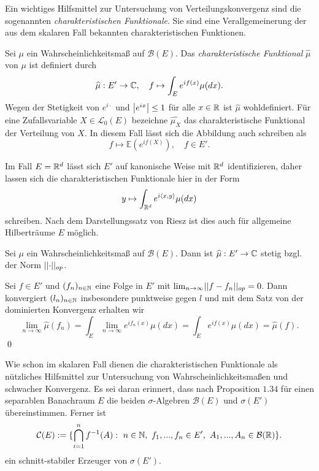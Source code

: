 Ein wichtiges Hilfsmittel zur Untersuchung von Verteilungskonvergenz sind die sogenannten \textit{charakteristischen Funktionale}. 
Sie sind eine Verallgemeinerung der aus dem skalaren Fall bekannten charakteristischen Funktionen.  

\begin{mydef}
    Sei $\mu$ ein Wahrscheinlichkeitsmaß auf $\mathcal{B}(E)$. 
    Das \textit{charakteristische Funktional} $\widehat{\mu}$ von $\mu$ ist definiert durch
    $$
        \widehat{\mu} : E' \to \mathbb{C}, \quad f \mapsto \int_{E}e^{if(x)}\mu(dx).
    $$
    Wegen der Stetigkeit von $e^{i\cdot}$ und $\left| e^{ix} \right|\leq 1$ für alle $x \in \mathbb{R}$ ist $\widehat{\mu}$ wohldefiniert. 
    Für eine Zufallsvariable $X \in \mathcal{L}_0(E)$ bezeichne $\widehat{\mu_X}$ das charakteristische Funktional der Verteilung von $X$. In diesem Fall lässt sich die Abbildung auch schreiben als
    $$
        f \mapsto \mathbb{E}(e^{if(X)}), \quad f \in E'. 
    $$
\end{mydef}

\begin{remark}
    Im Fall $E = \mathbb{R}^d$ lässt sich $E'$ auf kanonische Weise mit $\mathbb{R}^d$ identifizieren, daher lassen sich die charakteristischen Funktionale hier in der Form 
    $$
        y \mapsto \int_{\mathbb{R}^d}e^{i\langle x, y\rangle}\mu(dx)
    $$
    schreiben. Nach dem Darstellungssatz von Riesz ist dies auch für allgemeine Hilberträume $E$ möglich. 
\end{remark}

\begin{proposition}
    Sei $\mu$ ein Wahrscheinlichkeitsmaß auf $\mathcal{B}(E)$. Dann ist $\widehat{\mu}:E' \to \mathbb{C}$ stetig bzgl. der Norm $\lvert\lvert \cdot \rvert\rvert_{op}$. 
\end{proposition}
\begin{proof*}
    Sei $f \in E'$ und $(f_n)_{n \in \mathbb{N}}$ eine Folge in $E'$ mit $\lim_{n \to \infty}\lvert\lvert f-f_n \rvert\rvert_{op} = 0$. 
    Dann konvergiert $(l_n)_{n \in \mathbb{N}}$ insbesondere punktweise gegen $l$ und mit dem Satz von der dominierten Konvergenz erhalten wir 
    $$
        \lim_{n \to \infty} \widehat{\mu}(f_n) = \int_E\lim_{n \to \infty}e^{if_n(x)}\mu(dx) = \int_E e^{if(x)}\mu(dx) = \widehat{\mu}(f). 
    $$
    \qed
\end{proof*}

Wie schon im skalaren Fall dienen die charakteristischen Funktionale als nützliches Hilfsmittel zur Untersuchung von Wahrscheinlichkeitsmaßen und schwacher Konvergenz.
Es sei daran erinnert, dass nach Proposition $1.34$ für einen separablen Banachraum $E$ die beiden $\sigma$-Algebren $\mathcal{B}(E)$ und $\sigma(E')$ übereinstimmen. Ferner ist 
$$
    \mathcal{C}(E) := \{ \bigcap_{i=1}^n f^{-1}(A): \ n \in \N, \ f_1,...,f_n \in E', \ A_1,...,A_n \in \mathcal{B}(\R) \}.
$$ 
ein schnitt-stabiler Erzeuger von $\sigma(E')$. 

